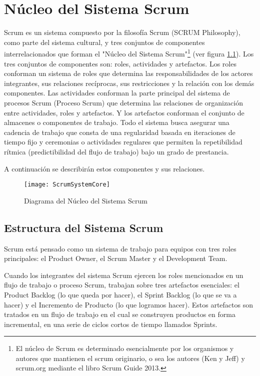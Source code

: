 
\chapter{Núcleo del Sistema Scrum}

Scrum es un sistema compuesto por la filosofía Scrum (SCRUM Philosophy), como parte del sistema cultural, y tres conjuntos de componentes interrelacionados que forman el "Núcleo del Sistema Scrum"\footnote{El núcleo de Scrum es determinado esencialmente por los organismos y autores que mantienen el scrum originario, o sea los autores (Ken y Jeff) y scrum.org mediante el libro Scrum Guide 2013\cite{Ken-Jeff-2013}.} (ver figura \ref{fig:ScrumSystemCore}). Los tres conjuntos de componentes son: roles, actividades y artefactos. Los roles conforman un sistema de roles que determina las responsabilidades de los actores integrantes, sus relaciones recíprocas, sus restricciones y la relación con los demás componentes. Las actividades conforman la parte principal del sistema de procesos Scrum (Proceso Scrum) que determina las relaciones de organización entre actividades, roles y artefactos. Y los artefactos conforman el conjunto de almacenes o componentes de trabajo. Todo el sistema busca asegurar una cadencia de trabajo que consta de una regularidad basada en iteraciones de tiempo fijo y ceremonias o actividades regulares que permiten la repetibilidad rítmica (predictibilidad del flujo de trabajo) bajo un grado de prestancia.

A continuación se describirán estos componentes y sus relaciones.

\begin{figure}[h]
  \centering
  \texttt{[image: ScrumSystemCore]}
  \caption{Diagrama del Núcleo del Sistema Scrum}
  \centering
  \label{fig:ScrumSystemCore} %
\end{figure}


\section{Estructura del Sistema Scrum}

Scrum está pensado como un sistema de trabajo para equipos con tres roles principales: el Product Owner, el Scrum Master y el Development Team. 

Cuando los integrantes del sistema Scrum ejercen los roles mencionados en un flujo de trabajo o proceso Scrum, trabajan sobre tres artefactos esenciales: el Product Backlog (lo que queda por hacer), el Sprint Backlog (lo que se va a hacer) y el Incremento de Producto (lo que logramos hacer). Estos artefactos son tratados en un flujo de trabajo en el cual se construyen productos en forma incremental, en una serie de ciclos cortos de tiempo llamados Sprints. 

